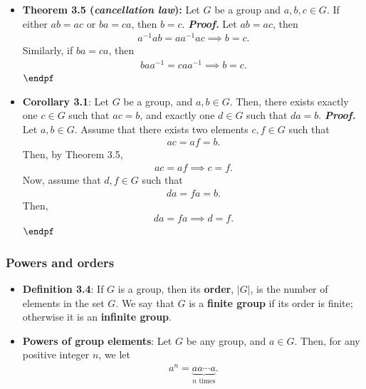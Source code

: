\documentclass{report}
\begin{document}
\begin{itemize}
        \item \textbf{Theorem 3.5 (\textit{cancellation law}):} Let $G$ be a group and $a,b,c \in G$. If either $ab = ac$ or $ba = ca$, then $b = c$.
            \bigbreak \noindent 
            \textbf{\textit{Proof.}} Let $ab = ac$, then
            \begin{align*}
                a^{-1}ab = aa^{-1}ac \implies b = c
            .\end{align*}
            Similarly, if $ba = ca$, then
            \begin{align*}
                baa^{-1} = caa^{-1} \implies b = c
            .\end{align*}
            $\endpf$
        \item \textbf{Corollary 3.1}: Let $G$ be a group, and $a,b \in G$. Then, there exists exactly one $c \in G$ such that $ac = b$, and exactly one $d \in G$ such that $da = b$.
            \bigbreak \noindent 
            \textbf{\textit{Proof.}} Let $a,b \in G$. Assume that there exists two elements $c,f \in G$ such that
            \begin{align*}
                ac = af = b
            .\end{align*}
            Then, by Theorem 3.5,
            \begin{align*}
                ac = af \implies c = f
            .\end{align*}
            Now, assume that $d,f \in G$ such that
            \begin{align*}
                da = fa = b
            .\end{align*}
            Then, 
            \begin{align*}
                da = fa \implies d = f
            .\end{align*}
            $\endpf$

    \end{itemize}

    \pagebreak 
    \subsubsection{Powers and orders}
    \begin{itemize}
        \item \textbf{Definition 3.4}: If $G$ is a group, then its \textbf{order}, $\left\lvert G \right\rvert $, is the number of elements in the set $G$. We say that $G$ is a \textbf{finite group} if its order is finite; otherwise it is an \textbf{infinite group}.
        \item \textbf{Powers of group elements}: Let $G$ be any group, and $a\in G$. Then, for any positive integer $n$, we let 
            \begin{align*}
                a^{n} = \underbrace{aa\cdots a}_{\text{$n$ times}}
            .\end{align*}




    \end{itemize}
\end{document}
